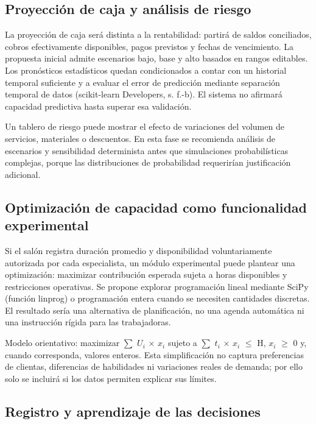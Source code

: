 \subsection{Proyección de caja y análisis de riesgo}

La proyección de caja será distinta a la rentabilidad: partirá de saldos conciliados, cobros efectivamente disponibles, pagos previstos y fechas de vencimiento. La propuesta inicial admite escenarios bajo, base y alto basados en rangos editables. Los pronósticos estadísticos quedan condicionados a contar con un historial temporal suficiente y a evaluar el error de predicción mediante separación temporal de datos (scikit-learn Developers, s. f.-b). El sistema no afirmará capacidad predictiva hasta superar esa validación.


Un tablero de riesgo puede mostrar el efecto de variaciones del volumen de servicios, materiales o descuentos. En esta fase se recomienda análisis de escenarios y sensibilidad determinista antes que simulaciones probabilísticas complejas, porque las distribuciones de probabilidad requerirían justificación adicional.


\subsection{Optimización de capacidad como funcionalidad experimental}

Si el salón registra duración promedio y disponibilidad voluntariamente autorizada por cada especialista, un módulo experimental puede plantear una optimización: maximizar contribución esperada sujeta a horas disponibles y restricciones operativas. Se propone explorar programación lineal mediante SciPy (función linprog) o programación entera cuando se necesiten cantidades discretas. El resultado sería una alternativa de planificación, no una agenda automática ni una instrucción rígida para las trabajadoras.


Modelo orientativo: maximizar $\sum$ $U_i$ × $x_i$ sujeto a $\sum$ $t_i$ × $x_i$ $\leq$ H, $x_i$ $\geq$ 0 y, cuando corresponda, valores enteros. Esta simplificación no captura preferencias de clientas, diferencias de habilidades ni variaciones reales de demanda; por ello solo se incluirá si los datos permiten explicar sus límites.


\subsection{Registro y aprendizaje de las decisiones}

